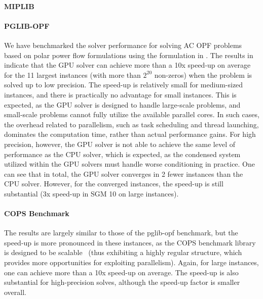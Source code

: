 \documentclass{article}
\begin{document}
\paragraph{MIPLIB}



\paragraph{PGLIB-OPF}
We have benchmarked the solver performance for solving AC OPF problems based on polar power flow formulations using the formulation in \cite{PowerModelsJLOpenSource}. The results in  indicate that the GPU solver can achieve more than a 10x speed-up on average for the 11 largest instances (with more than $2^{20}$ non-zeros) when the problem is solved up to low precision. The speed-up is relatively small for medium-sized instances, and there is practically no advantage for small instances. This is expected, as the GPU solver is designed to handle large-scale problems, and small-scale problems cannot fully utilize the available parallel cores. In such cases, the overhead related to parallelism, such as task scheduling and thread launching, dominates the computation time, rather than actual performance gains. For high precision, however, the GPU solver is not able to achieve the same level of performance as the CPU solver, which is expected, as the condensed system utilized within the GPU solvers must handle worse conditioning in practice. One can see that in total, the GPU solver converges in 2 fewer instances than the CPU solver. However, for the converged instances, the speed-up is still substantial (3x speed-up in SGM 10 on large instances).



\paragraph{COPS Benchmark}
The results are largely similar to those of the pglib-opf benchmark, but the speed-up is more pronounced in these instances, as the COPS benchmark library is designed to be scalable~\cite{dolanBenchmarkingOptimizationSoftware2001} (thus exhibiting a highly regular structure, which provides more opportunities for exploiting parallelism). Again, for large instances, one can achieve more than a 10x speed-up on average. The speed-up is also substantial for high-precision solves, although the speed-up factor is smaller overall.
\end{document}
